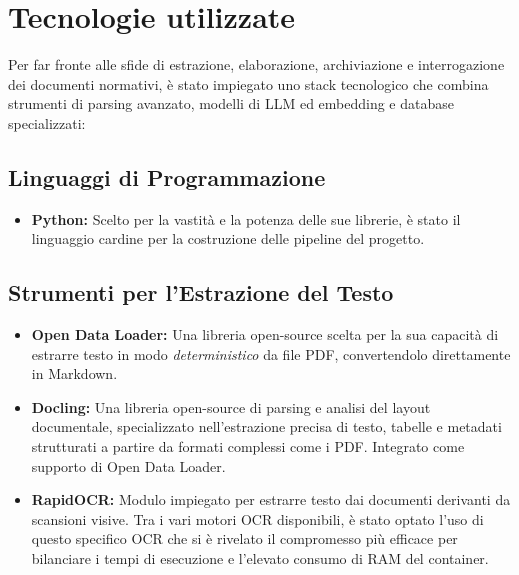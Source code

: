 \section{Tecnologie utilizzate}
Per far fronte alle sfide di estrazione, elaborazione, archiviazione e interrogazione dei documenti normativi, è stato impiegato uno stack tecnologico che combina strumenti di parsing avanzato, modelli di LLM ed embedding e database specializzati:

\subsection*{Linguaggi di Programmazione}
\begin{itemize}
    \item \textbf{Python:} Scelto per la vastità e la potenza delle sue librerie, è stato il linguaggio cardine per la costruzione delle pipeline del progetto.
\end{itemize}

\subsection*{Strumenti per l'Estrazione del Testo}
\begin{itemize}
   \item \textbf{Open Data Loader:} Una libreria open-source scelta per la sua capacità di estrarre testo in modo \textit{deterministico} da file PDF, convertendolo direttamente in Markdown.
    \item \textbf{Docling:} Una libreria open-source di parsing e analisi del layout documentale, specializzato nell'estrazione precisa di testo, tabelle e metadati strutturati a partire da formati complessi come i PDF. Integrato come supporto di Open Data Loader.
    \item \textbf{RapidOCR:} Modulo impiegato per estrarre testo dai documenti derivanti da scansioni visive.
    Tra i vari motori OCR disponibili, è stato optato l'uso di questo specifico OCR che si è rivelato il compromesso più efficace per bilanciare i tempi di esecuzione e l'elevato consumo di RAM del container.
\end{itemize}

